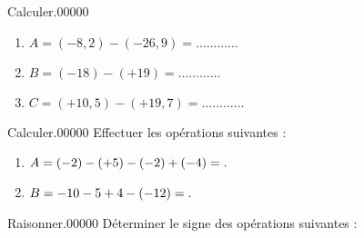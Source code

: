 \documentclass[a4paper,dvipsnames,french,10pt]{book}
\begin{document}
\begin{pageParcoursd}
{\begin{ExoCdN}{Calculer.}{0}{0}{0}{0}{0}
\begin{enumerate}
\item $A=(-8,2)-(-26,9)=\ldots\ldots\ldots\ldots$ \vspace{.2cm}
\item $B=(-18)-(+19)=\ldots\ldots\ldots\ldots$ \vspace{.2cm}
\item $C=(+10,5)-(+19,7)=\ldots\ldots\ldots\ldots$ \vspace{.2cm}
\end{enumerate}
\end{ExoCdN}
}




\begin{ExoCdN}{Calculer.}{0}{0}{0}{0}{0}
Effectuer les opérations suivantes :\vspace{.2cm}
\begin{enumerate}
\item $A=(-2)-(+5)-(-2)+(-4)=.\dotfill $\vspace{.2cm}
\item $B=-10-5+4-(-12)=.\dotfill $
\end{enumerate}
\end{ExoCdN}

\begin{ExoCdN}{Raisonner.}{0}{0}{0}{0}{0}
Déterminer le signe des opérations suivantes :\vspace{.2cm}



\end{ExoCdN}
\end{pageParcoursd}
\end{document}
